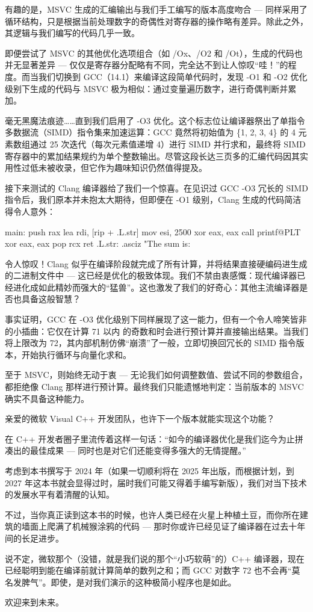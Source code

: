 有趣的是，MSVC 生成的汇编输出与我们手工编写的版本高度吻合 --- 同样采用了循环结构，只是根据当前处理数字的奇偶性对寄存器的操作略有差异。除此之外，其逻辑与我们编写的代码几乎一致。

即便尝试了 MSVC 的其他优化选项组合（如 /Ox、/O2 和 /Ot），生成的代码也并无显著差异 --- 仅仅是寄存器分配略有不同，完全达不到让人惊叹“哇！”的程度。而当我们切换到 GCC（14.1）来编译这段简单代码时，发现 -O1 和 -O2 优化级别下生成的代码与 MSVC 极为相似：通过变量遍历数字，进行奇偶判断并累加。

毫无黑魔法痕迹……直到我们启用了 -O3 优化。这个标志位让编译器祭出了单指令多数据流（SIMD）指令集来加速运算：GCC 竟然将初始值为 \{1, 2, 3, 4\} 的 4 元素数组通过 25 次迭代（每次元素值递增 4）进行 SIMD 并行求和，最终将 SIMD 寄存器中的累加结果规约为单个整数输出。尽管这段长达三页多的汇编代码因其实用性过低未被收录，但它作为趣味知识仍然值得提及。

接下来测试的 Clang 编译器给了我们一个惊喜。在见识过 GCC -O3 冗长的 SIMD 指令后，我们原本并未抱太大期待，但即便在 -O1 级别，Clang 生成的代码简洁得令人意外：

\begin{shell}
main:
  push rax
  lea rdi, [rip + .L.str]
  mov esi, 2500
  xor eax, eax
  call printf@PLT
  xor eax, eax
  pop rcx
  ret
.L.str:
  .asciz "The sum is: %
\end{shell}

令人惊叹！Clang 似乎在编译阶段就完成了所有计算，并将结果直接硬编码进生成的二进制文件中 --- 这已经是优化的极致体现。我们不禁由衷感慨：现代编译器已经进化成如此精妙而强大的“猛兽”。这也激发了我们的好奇心：其他主流编译器是否也具备这般智慧？

事实证明，GCC 在 -O3 优化级别下同样展现了这一能力，但有一个令人啼笑皆非的小插曲：它仅在计算 71 以内 的奇数和时会进行预计算并直接输出结果。当我们将上限改为 72，其内部机制仿佛“崩溃”了一般，立即切换回冗长的 SIMD 指令版本，开始执行循环与向量化求和。

至于 MSVC，则始终无动于衷 --- 无论我们如何调整数值、尝试不同的参数组合，都拒绝像 Clang 那样进行预计算。最终我们只能遗憾地判定：当前版本的 MSVC 确实不具备这种能力。

亲爱的微软 Visual C++ 开发团队，也许下一个版本就能实现这个功能？


在 C++ 开发者圈子里流传着这样一句话：“如今的编译器优化是我们迄今为止拼凑出的最佳成果 --- 同时也是对它们还能变得多强大的无情提醒。”

考虑到本书撰写于 2024 年（如果一切顺利将在 2025 年出版，而根据计划，到 2027 年这本书就会显得过时，届时我们可能又得着手编写新版），我们对当下技术的发展水平有着清醒的认知。

不过，当你真正读到这本书的时候，也许人类已经在火星上种植土豆，而你所在建筑的墙面上爬满了机械猴涂鸦的代码 --- 那时你或许已经见证了编译器在过去十年间的长足进步。

说不定，微软那个（没错，就是我们说的那个“小巧软萌”的）C++ 编译器，现在已经聪明到能在编译前就计算简单的数列之和；而 GCC 对数字 72 也不会再“莫名发脾气”。即使，是对我们演示的这种极简小程序也是如此。

欢迎来到未来。







